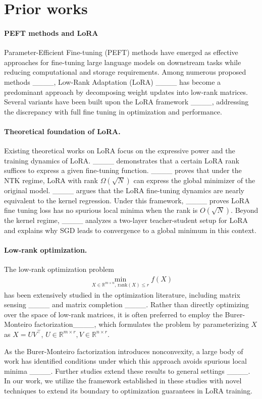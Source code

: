 \section{Prior works}
\label{sec::1.1} 
\paragraph{PEFT methods and LoRA}
Parameter-Efficient Fine-tuning (PEFT) methods have emerged as effective approaches for fine-tuning large language models on downstream tasks while reducing computational and storage requirements. Among numerous proposed methods ____, Low-Rank Adaptation (LoRA) ____ has become a predominant approach by decomposing weight updates into low-rank matrices. Several variants have been built upon the LoRA framework ____, addressing the discrepancy with full fine tuning in optimization and performance.

\paragraph{Theoretical foundation of LoRA.}
Existing theoretical works on LoRA focus on the expressive power and the training dynamics of LoRA.  ____ demonstrates that a certain LoRA rank suffices to express a given fine-tuning function. ____ proves that under the NTK regime, LoRA with rank $\Omega (\sqrt{N})$ can express the global minimizer of the original model. ____ argues that the LoRA fine-tuning dynamics are nearly equivalent to the kernel regression. Under this framework, ____ proves LoRA fine tuning loss has no spurious local minima when the rank is $O(\sqrt{N})$. Beyond the kernel regime, ____ analyzes a two-layer teacher-student setup for LoRA and explains why SGD leads to convergence to a global minimum in this context.








\paragraph{Low-rank optimization.}
The low-rank optimization problem 
\vspace{-0.2in}
\begin{align*}
    \min_{X\in \mathbb{R}^{m\times n}, \,\mathrm{rank}(X)\le r} f(X)
\end{align*}
has been extensively studied in the optimization literature, including matrix sensing  ____ and matrix completion ____. 
Rather than directly optimizing over the space of low-rank matrices, it is often preferred to employ the Burer-Monteiro factorization____, which formulates the problem by parameterizing $X$ as $X=UV^\intercal$, $U\in \mathbb{R}^{m\times r}, V\in \mathbb{R}^{n\times r}$.




As the Burer-Monteiro factorization introduces nonconvexity, a large body of work has identified conditions under which this approach avoids spurious local minima ____. Further studies extend these results to general settings ____. In our work, we utilize the framework established in these studies with novel techniques to extend its boundary to optimization guarantees in LoRA training.